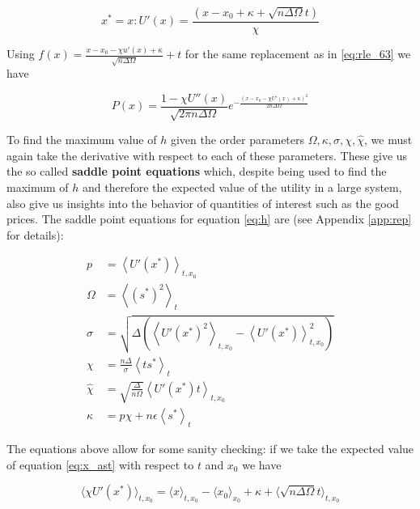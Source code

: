  \begin{equation}
    \label{eq:x_ast}
    x^* = x : U'(x) = \frac{(x - x_0 + \kappa +
      \sqrt{n\Delta\Omega}t)}{\chi}
  \end{equation}

Using $f(x) = \frac{x - x_0 - \chi u'(x) + \kappa}{\sqrt{n \Delta \Omega}} + t$ for the same replacement as in \eqref{eq:rle_63} we have

\begin{equation}
  \label{eq:rle_66}
  P(x) = \frac{1 - \chi U''(x)}{\sqrt{2\pi n \Delta \Omega}} e^{-
    \frac{(x - x_0 - \chi U'(x) + \kappa)^2}{2n\Delta \Omega}}
\end{equation}

To find the maximum value of $h$ given the order parameters $\Omega, \kappa,
  \sigma, \chi, \hat{\chi}$, we must again take the derivative with respect to each of these parameters. These give us the so called \textbf{saddle point equations} which, despite being used to find the maximum of $h$ and therefore the expected value of the utility in a large system, also give us insights into the behavior of quantities of interest such as the good prices. The saddle point equations for equation \eqref{eq:h} are (see Appendix \ref{app:rep} for details):

\begin{align}
  p & = \left \langle U'(x^*) \right \rangle_{t,x_0} \label{eq:saddlep} \\
\Omega & = \left\langle (s^*)^2 \right\rangle_t \label{eq:saddleomega}\\
\sigma & = \sqrt{\Delta
    \left(\left \langle U'(x^*)^2 \right \rangle_{t,x_0} - \left
        \langle U'(x^*) \right \rangle_{t,x_0}^2 \right)} \label{eq:saddlesigma}\\
    \chi & = \frac{n\Delta}{\sigma} \left \langle t s^* \right
    \rangle_t \label{eq:saddlechi}\\
\hat{\chi} & = \sqrt{\frac{\Delta}{n\Omega}} \left \langle U'(x^*) t
\right \rangle_{t,x_0} \label{eq:saddlehatchi}\\
  \kappa & = p \chi + n\epsilon \left \langle s^* \right \rangle_t \label{eq:saddlekappa}
\end{align}

The equations above allow for some sanity checking: if we take the expected value of equation \eqref{eq:x_ast} with respect to $t$ and $x_0$ we have

\begin{equation}
  \langle \chi U'(x^\ast) \rangle_{t, x_0} = \langle x \rangle_{t, x_0} - \langle x_0 \rangle_{x_0} + \kappa + \langle \sqrt{n\Delta\Omega}t \rangle_{t, x_0}
\end{equation}

